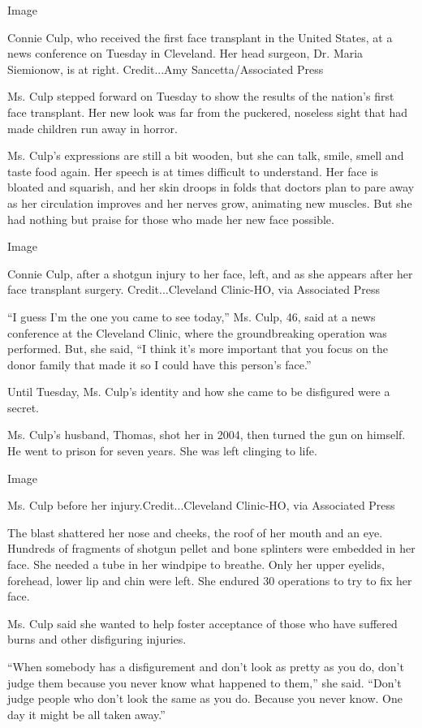 Image

Connie Culp, who received the first face transplant in the United
States, at a news conference on Tuesday in Cleveland. Her head surgeon,
Dr. Maria Siemionow, is at right. Credit...Amy Sancetta/Associated Press

Ms. Culp stepped forward on Tuesday to show the results of the nation's
first face transplant. Her new look was far from the puckered, noseless
sight that had made children run away in horror.

Ms. Culp's expressions are still a bit wooden, but she can talk, smile,
smell and taste food again. Her speech is at times difficult to
understand. Her face is bloated and squarish, and her skin droops in
folds that doctors plan to pare away as her circulation improves and her
nerves grow, animating new muscles. But she had nothing but praise for
those who made her new face possible.

Image

Connie Culp, after a shotgun injury to her face, left, and as she
appears after her face transplant surgery. Credit...Cleveland Clinic-HO,
via Associated Press

``I guess I'm the one you came to see today,'' Ms. Culp, 46, said at a
news conference at the Cleveland Clinic, where the groundbreaking
operation was performed. But, she said, ``I think it's more important
that you focus on the donor family that made it so I could have this
person's face.''

Until Tuesday, Ms. Culp's identity and how she came to be disfigured
were a secret.

Ms. Culp's husband, Thomas, shot her in 2004, then turned the gun on
himself. He went to prison for seven years. She was left clinging to
life.

Image

Ms. Culp before her injury.Credit...Cleveland Clinic-HO, via Associated
Press

The blast shattered her nose and cheeks, the roof of her mouth and an
eye. Hundreds of fragments of shotgun pellet and bone splinters were
embedded in her face. She needed a tube in her windpipe to breathe. Only
her upper eyelids, forehead, lower lip and chin were left. She endured
30 operations to try to fix her face.

Ms. Culp said she wanted to help foster acceptance of those who have
suffered burns and other disfiguring injuries.

``When somebody has a disfigurement and don't look as pretty as you do,
don't judge them because you never know what happened to them,'' she
said. ``Don't judge people who don't look the same as you do. Because
you never know. One day it might be all taken away.''

